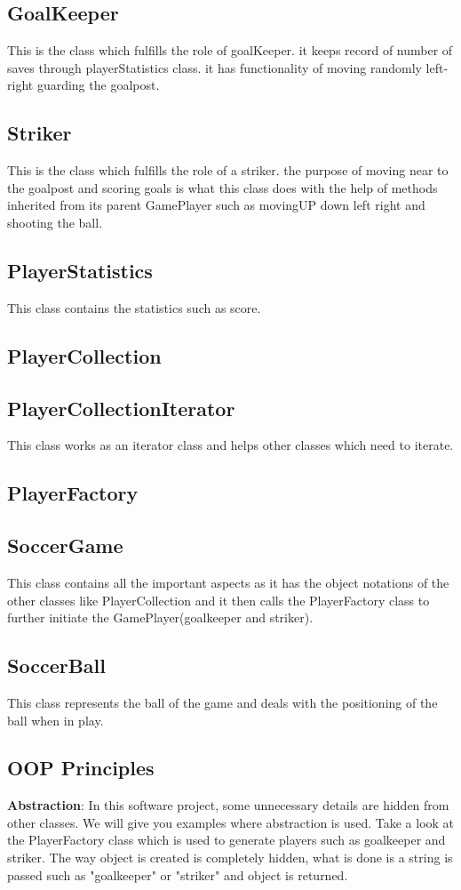 \documentclass[12pt, dvipsnames, a4paper]{article}
\begin{document}
\subsection{GoalKeeper}
This is the class which fulfills the role of goalKeeper. it keeps record of number of saves through
playerStatistics class. it has functionality of moving randomly left-right guarding the goalpost.
\subsection{Striker}
This is the class which fulfills the role of a striker. the purpose of moving near to the goalpost
and scoring goals is what this class does with the help of methods inherited from its parent GamePlayer such as
movingUP down left right and shooting the ball.
\subsection{PlayerStatistics}
This class contains the statistics such as score.
\subsection{PlayerCollection}
\subsection{PlayerCollectionIterator}
This class works as an iterator class and helps other classes which need to iterate.
\subsection{PlayerFactory}
\subsection{SoccerGame}
This class contains all the important aspects as it has the object notations of the other classes like PlayerCollection and it then
calls the PlayerFactory class to further initiate the GamePlayer(goalkeeper and striker).
\subsection{SoccerBall}
This class represents the ball of the game and deals with the positioning of the ball when in play.

\clearpage

\subsection{OOP Principles}
\textbf{Abstraction}: In this software project, some unnecessary details are hidden from other classes. We will give you examples
where abstraction is used. Take a look at the PlayerFactory class which is used to generate players such as goalkeeper
and striker. The way object is created is completely hidden, what is done is a string is passed such as "goalkeeper" or
"striker" and object is returned.
\end{document}
